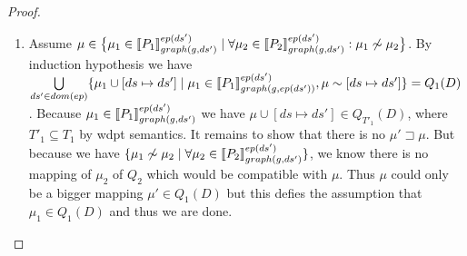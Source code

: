 \begin{proof}
\begin{enumerate}
\begin{enumerate}
				\item Assume $\mu \in \big\{ \mu_1 \in  \llbracket P_1 \rrbracket^{ep(ds')}_{graph(g,ds')} \mid 
						\forall \mu_2 \in \llbracket P_2 \rrbracket^{ep(ds')}_{graph(g,ds')}: 
					\mu_1 \not\sim \mu_2 \big\}$. 
					By induction hypothesis we have 
					$\bigcup\limits_{ds' \in dom(ep)} \{ \mu_1 \cup	[ds	\mapsto ds'] 
						\mid \mu_1 \in \llbracket	P_1\rrbracket^{ep(ds')}_{graph(g,ep(ds'))}, \mu \sim
					[ds\mapsto ds'] \}  = Q_1(D)$.
					Because $\mu_1 \in \llbracket P_1
					\rrbracket^{ep(ds')}_{graph(g,ds')}$ 
					we have $\mu\cup [ds \mapsto ds'] \in Q_{T'_1}(D)$, where
					$T'_1 \subseteq T_1$ by wdpt semantics.
					It remains to show that there
					is no $\mu' \sqsupset \mu$. But because we have $\{\mu_1 \not\sim \mu_2 \mid
					\forall \mu_2 \in \llbracket P_2 \rrbracket^{ep(ds')}_{graph(g,ds')} \}$, 
					we know there is no mapping
					of $\mu_2$ of $Q_2$ which would be compatible with $\mu$. Thus $\mu$ could
					only be a bigger mapping $\mu' \in Q_1(D)$ but this defies the
					assumption that $\mu_1 \in Q_1(D)$ and thus we are done.
			\end{enumerate}


\end{enumerate}
\end{proof}
